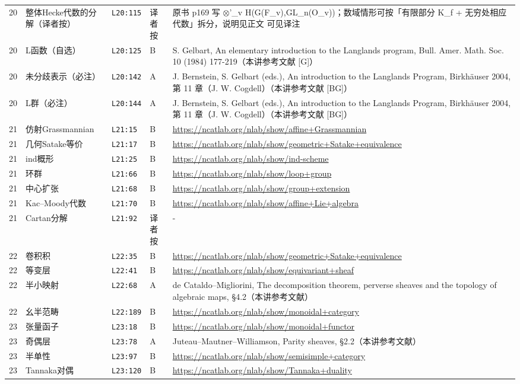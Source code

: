 \begin{longtable}{@{}p{1.0cm}p{3.3cm}p{1.5cm}p{1.3cm}p{7.9cm}@{}}
20 & 整体Hecke代数的分解（译者按） & \texttt{L20:115} & 译者按 & 原书 p169 写 $\otimes$'\_v H(G(F\_v),GL\_n(O\_v))；数域情形可按「有限部分 K\_f + 无穷处相应代数」拆分，说明见正文 可见译注 \\
20 & L函数（自选） & \texttt{L20:125} & B & S. Gelbart, An elementary introduction to the Langlands program, Bull. Amer. Math. Soc. 10 (1984) 177-219（本讲参考文献 [G]） \\
20 & 未分歧表示（必注） & \texttt{L20:142} & A & J. Bernstein, S. Gelbart (eds.), An introduction to the Langlands Program, Birkhäuser 2004, 第 11 章（J. W. Cogdell）（本讲参考文献 [BG]） \\
20 & L群（必注） & \texttt{L20:144} & A & J. Bernstein, S. Gelbart (eds.), An introduction to the Langlands Program, Birkhäuser 2004, 第 11 章（J. W. Cogdell）（本讲参考文献 [BG]） \\
\midrule
21 & 仿射Grassmannian & \texttt{L21:15} & B & \url{https://ncatlab.org/nlab/show/affine+Grassmannian} \\
21 & 几何Satake等价 & \texttt{L21:17} & B & \url{https://ncatlab.org/nlab/show/geometric+Satake+equivalence} \\
21 & ind概形 & \texttt{L21:25} & B & \url{https://ncatlab.org/nlab/show/ind-scheme} \\
21 & 环群 & \texttt{L21:66} & B & \url{https://ncatlab.org/nlab/show/loop+group} \\
21 & 中心扩张 & \texttt{L21:68} & B & \url{https://ncatlab.org/nlab/show/group+extension} \\
21 & Kac–Moody代数 & \texttt{L21:70} & B & \url{https://ncatlab.org/nlab/show/affine+Lie+algebra} \\
21 & Cartan分解 & \texttt{L21:92} & 译者按 & - \\
\midrule
22 & 卷积积 & \texttt{L22:35} & B & \url{https://ncatlab.org/nlab/show/geometric+Satake+equivalence} \\
22 & 等变层 & \texttt{L22:41} & B & \url{https://ncatlab.org/nlab/show/equivariant+sheaf} \\
22 & 半小映射 & \texttt{L22:68} & A & de Cataldo–Migliorini, The decomposition theorem, perverse sheaves and the topology of algebraic maps, §4.2（本讲参考文献） \\
22 & 幺半范畴 & \texttt{L22:189} & B & \url{https://ncatlab.org/nlab/show/monoidal+category} \\
\midrule
23 & 张量函子 & \texttt{L23:18} & B & \url{https://ncatlab.org/nlab/show/monoidal+functor} \\
23 & 奇偶层 & \texttt{L23:78} & A & Juteau–Mautner–Williamson, Parity sheaves, §2.2（本讲参考文献） \\
23 & 半单性 & \texttt{L23:97} & B & \url{https://ncatlab.org/nlab/show/semisimple+category} \\
23 & Tannaka对偶 & \texttt{L23:120} & B & \url{https://ncatlab.org/nlab/show/Tannaka+duality} \\
\end{longtable}
\endgroup

